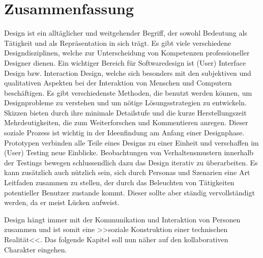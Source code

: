 \section*{Zusammenfassung}
Design ist ein alltäglicher und weitgehender Begriff, der sowohl Bedeutung als Tätigkeit und als Repräsentation in sich trägt. Es gibt viele verschiedene Designdisziplinen, welche zur Unterscheidung von Kompetenzen professioneller Designer dienen. Ein wichtiger Bereich für Softwaredesign ist (User) Interface Design bzw. Interaction Design, welche sich besonders mit den subjektiven und qualitativen Aspekten bei der Interaktion von Menschen und Computern beschäftigen. Es gibt verschiedenste Methoden, die benutzt werden können, um Designprobleme zu verstehen und um nötige Lösungsstrategien zu entwickeln. Skizzen bieten durch ihre minimale Detailstufe und die kurze Herstellungszeit Mehrdeutigkeiten, die zum Weiterforschen und Kommentieren anregen. Dieser soziale Prozess ist wichtig in der Ideenfindung am Anfang einer Designphase. Prototypen verbinden alle Teile eines Designs zu einer Einheit und verschaffen im (User) Testing neue Einblicke. Beobachtungen von Verhaltensmustern innerhalb der Testings bewegen schlussendlich dazu das Design iterativ zu überarbeiten. Es kann zusätzlich auch nützlich sein, sich durch Personas und Szenarien eine Art Leitfaden zusammen zu stellen, der durch das Beleuchten von Tätigkeiten potentieller Benutzer zustande kommt. Dieser sollte aber ständig vervollständigt werden, da er meist Lücken aufweist. %

Design hängt immer mit der Kommunikation und Interaktion von Personen zusammen und ist somit eine >>soziale Konstruktion einer technischen Realität<<. Das folgende Kapitel soll nun näher auf den kollaborativen Charakter eingehen.

